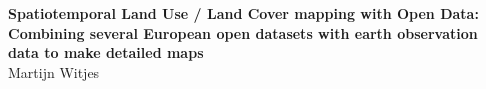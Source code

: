 \thispagestyle{empty}
\begin{center}
\Huge{\textbf{Spatiotemporal Land Use / Land Cover mapping with Open Data:}} \\
\Huge{\textbf{Combining several European open datasets with earth observation data to make detailed maps}} \\
\vspace*{1cm}
\vspace*{1cm}
\vspace*{\fill}
\large{Martijn Witjes}\\
\end{center}

\newpage
\thispagestyle{empty}
\vspace*{\fill}
